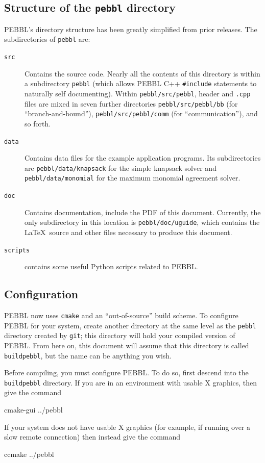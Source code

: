 \subsection{Structure of the \texttt{pebbl} directory}
\label{sec:dirstruct}
PEBBL's directory structure has been greatly simplified from prior releases.
The subdirectories of \texttt{pebbl} are:
\begin{description}
\item[\texttt{src}]  Contains the source code.  Nearly all the contents of
this directory is within a subdirectory \texttt{pebbl} (which allows PEBBL C++
\texttt{\#include} statements to naturally self documenting).  Within
\texttt{pebbl/src/pebbl}, header and \texttt{.cpp} files are mixed in seven
further directories \texttt{pebbl/src/pebbl/bb} (for ``branch-and-bound''),
\texttt{pebbl/src/pebbl/comm} (for ``communication''), and so forth.
\item[\texttt{data}] Contains data files for the example application programs.
Its subdirectories are \texttt{pebbl/\linebreak[1]data/knapsack} for the
simple knapsack solver and \texttt{pebbl/data/monomial} for the maximum
monomial agreement solver.
\item[\texttt{doc}] Contains documentation, include the PDF of this document.
Currently, the only subdirectory in 
this location is \texttt{pebbl/doc/uguide}, which contains the \LaTeX~source
and other files necessary to produce this document. 
\item[\texttt{scripts}] contains some useful Python scripts related to PEBBL.
\end{description}


\subsection{Configuration}
\label{sec:configure}
PEBBL now uses \texttt{cmake} and an ``out-of-source'' build scheme.  To
configure PEBBL for your system, create another directory at the same level as
the \texttt{pebbl} directory created by \texttt{git}; this directory will hold
your compiled version of PEBBL.  From here on, this document will assume that
this directory is called \texttt{buildpebbl}, but the name can be anything you
wish.

Before compiling, you must configure PEBBL.  To do so, first descend into the
\texttt{buildpebbl} directory.  If you are in an environment with usable X
graphics, then give the command
\begin{codeblock}
cmake-gui ../pebbl
\end{codeblock}
If your system does not have usable X graphics (for example, if running over a
slow remote connection) then instead give the command
\begin{codeblock}
ccmake ../pebbl
\end{codeblock}

